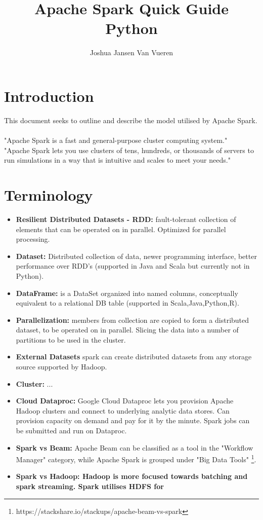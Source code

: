 \documentclass[english]{article}
\begin{document}
\title{Apache Spark Quick Guide \\
Python}


\author{Joshua Jansen Van Vueren}

\maketitle

\section*{Introduction}
This document seeks to outline and describe the model utilised by Apache Spark.
\\\\
"Apache Spark is a fast and general-purpose cluster computing system." 
\\
"Apache Spark lets you use clusters of tens, hundreds, or thousands of servers to run simulations in a way that is intuitive and scales to meet your needs."
\section{Terminology}
\begin{itemize}
\item \textbf{Resilient Distributed Datasets - RDD: } fault-tolerant collection of elements that can be operated on in parallel. Optimized for parallel processing.
\item \textbf{Dataset: } Distributed collection of data, newer programming interface, better performance over RDD's (supported in Java and Scala but currently not in Python).
\item \textbf{DataFrame: } is a DataSet organized into named columns, conceptually equivalent to a relational DB table (supported in Scala,Java,Python,R).
\item \textbf{Parallelization: } members from collection are copied to form a distributed dataset, to be operated on in parallel. Slicing the data into a number of partitions to be used in the cluster.
\item \textbf{External Datasets} spark can create distributed datasets from any storage source supported by Hadoop.
\item \textbf{Cluster: } ...
\item \textbf{Cloud Dataproc: } Google Cloud Dataproc lets you provision Apache Hadoop clusters and connect to underlying analytic data stores. Can provision capacity on demand and pay for it by the minute. Spark jobs can be submitted and run on Dataproc.
\item \textbf{Spark vs Beam: } Apache Beam can be classified as a tool in the "Workflow Manager" category, while Apache Spark is grouped under "Big Data Tools" \footnote{https://stackshare.io/stackups/apache-beam-vs-spark}.
\item \textbf{Spark vs Hadoop: Hadoop is more focused towards batching and spark streaming. Spark utilises HDFS for}
\end{itemize}
\end{document}
